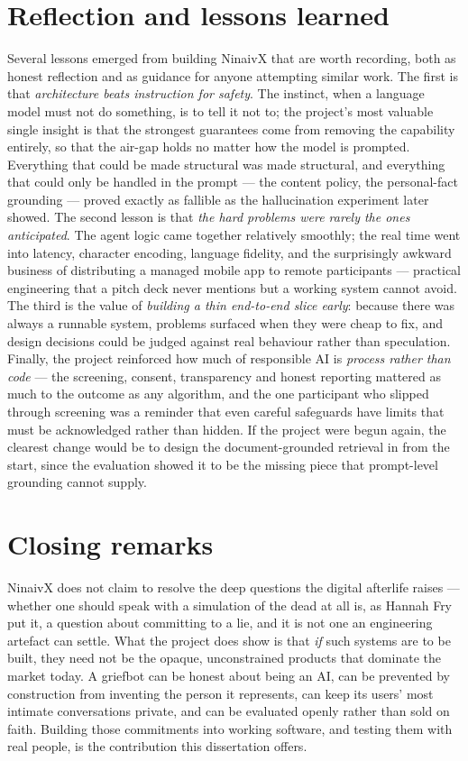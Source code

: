 \documentclass[11pt,a4paper]{report}
\begin{document}
\section{Reflection and lessons learned}
Several lessons emerged from building NinaivX that are worth recording, both as honest reflection and as guidance for anyone attempting similar work. The first is that \emph{architecture beats instruction for safety}. The instinct, when a language model must not do something, is to tell it not to; the project's most valuable single insight is that the strongest guarantees come from removing the capability entirely, so that the air-gap holds no matter how the model is prompted. Everything that could be made structural was made structural, and everything that could only be handled in the prompt --- the content policy, the personal-fact grounding --- proved exactly as fallible as the hallucination experiment later showed. The second lesson is that \emph{the hard problems were rarely the ones anticipated}. The agent logic came together relatively smoothly; the real time went into latency, character encoding, language fidelity, and the surprisingly awkward business of distributing a managed mobile app to remote participants --- practical engineering that a pitch deck never mentions but a working system cannot avoid. The third is the value of \emph{building a thin end-to-end slice early}: because there was always a runnable system, problems surfaced when they were cheap to fix, and design decisions could be judged against real behaviour rather than speculation. Finally, the project reinforced how much of responsible AI is \emph{process rather than code} --- the screening, consent, transparency and honest reporting mattered as much to the outcome as any algorithm, and the one participant who slipped through screening was a reminder that even careful safeguards have limits that must be acknowledged rather than hidden. If the project were begun again, the clearest change would be to design the document-grounded retrieval in from the start, since the evaluation showed it to be the missing piece that prompt-level grounding cannot supply.

\section{Closing remarks}
NinaivX does not claim to resolve the deep questions the digital afterlife raises --- whether one should speak with a simulation of the dead at all is, as Hannah Fry put it, a question about committing to a lie, and it is not one an engineering artefact can settle. What the project does show is that \emph{if} such systems are to be built, they need not be the opaque, unconstrained products that dominate the market today. A griefbot can be honest about being an AI, can be prevented by construction from inventing the person it represents, can keep its users' most intimate conversations private, and can be evaluated openly rather than sold on faith. Building those commitments into working software, and testing them with real people, is the contribution this dissertation offers.
\end{document}
